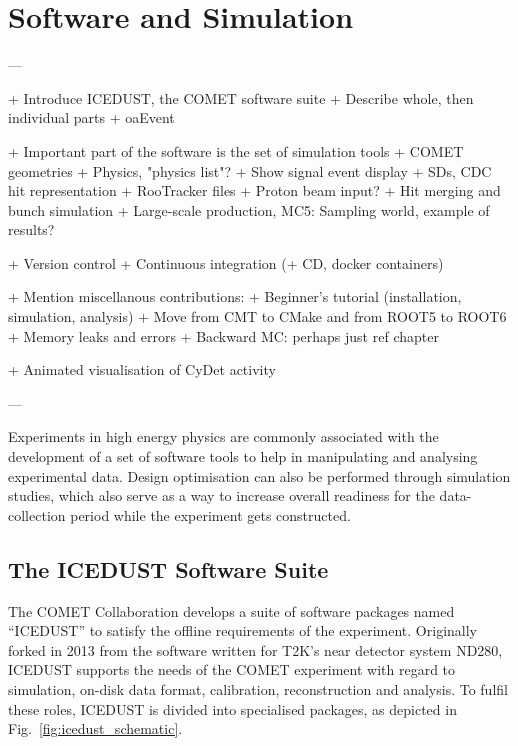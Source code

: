 \chapter{Software and Simulation}\label{chapter3}

\newcommand{\SimG}{\texttt{SimG4}\xspace}
\newcommand{\oaEvent}{\texttt{oaEvent}\xspace}
\newcommand{\Geant}{{\sc Geant4}\xspace}

\begin{markdown}
---

+ Introduce ICEDUST, the COMET software suite
    + Describe whole, then individual parts
    + oaEvent
 
+ Important part of the software is the set of simulation tools
    + COMET geometries
    + Physics, "physics list"?
    + Show signal event display
    + SDs, CDC hit representation
    + RooTracker files
    + Proton beam input?
    + Hit merging and bunch simulation
    + Large-scale production, MC5: Sampling world, example of results?
    
    
+ Version control
+ Continuous integration (+ CD, docker containers)
    
+ Mention miscellanous contributions:
    + Beginner's tutorial (installation, simulation, analysis)
    + Move from CMT to CMake and from ROOT5 to ROOT6
    + Memory leaks and errors
    + Backward MC: perhaps just ref chapter

+ Animated visualisation of CyDet activity

---
\end{markdown}

Experiments in high energy physics are commonly associated with the development of a set of software tools to help in manipulating and analysing experimental data. Design optimisation can also be performed through simulation studies, which also serve as a way to increase overall readiness for the data-collection period while the experiment gets constructed.

\section{The ICEDUST Software Suite}
The COMET Collaboration develops a suite of software packages named ``ICEDUST'' to satisfy the offline requirements of the experiment. Originally forked in 2013 from the software written for T2K's near detector system ND280, ICEDUST supports the needs of the COMET experiment with regard to simulation, on-disk data format, calibration, reconstruction and analysis.
To fulfil these roles, ICEDUST is divided into specialised packages, as depicted in Fig.~\ref{fig:icedust_schematic}.

